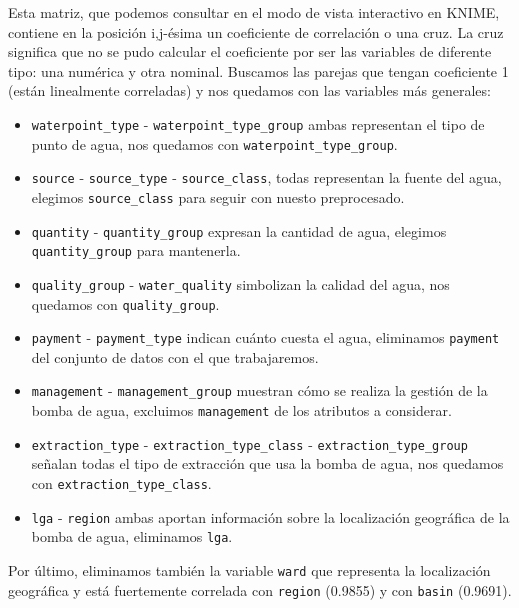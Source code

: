 \documentclass[a4paper, 20pt]{article}
\begin{document}
Esta matriz, que podemos consultar en el modo de vista interactivo en KNIME, contiene en la posición i,j-ésima un coeficiente de correlación o una cruz. La cruz significa que no se pudo calcular el coeficiente por ser las variables de diferente tipo: una numérica y otra nominal. Buscamos las parejas que tengan coeficiente 1 (están linealmente correladas) y nos quedamos con las variables más generales:
\begin{itemize}
\item \texttt{waterpoint\_type} - \texttt{waterpoint\_type\_group} ambas representan el tipo de punto de agua, nos quedamos con \texttt{waterpoint\_type\_group}.
  
\item \texttt{source} - \texttt{source\_type} - \texttt{source\_class}, todas representan la fuente del agua, elegimos \texttt{source\_class} para seguir con nuesto preprocesado.
  
\item \texttt{quantity} - \texttt{quantity\_group} expresan la cantidad de agua, elegimos \texttt{quantity\_group} para mantenerla.
  
\item \texttt{quality\_group} - \texttt{water\_quality} simbolizan la calidad del agua, nos quedamos con \texttt{quality\_group}.

\item \texttt{payment} - \texttt{payment\_type} indican cuánto cuesta el agua, eliminamos \texttt{payment} del conjunto de datos con el que trabajaremos.

\item \texttt{management} - \texttt{management\_group} muestran cómo se realiza la gestión de la bomba de agua, excluimos \texttt{management} de los atributos a considerar.

\item \texttt{extraction\_type} - \texttt{extraction\_type\_class} - \texttt{extraction\_type\_group} señalan todas el tipo de extracción que usa la bomba de agua, nos quedamos con \texttt{extraction\_type\_class}.

  \item \texttt{lga} - \texttt{region} ambas aportan información sobre la localización geográfica de la bomba de agua, eliminamos \texttt{lga}.
\end{itemize}

Por último, eliminamos también la variable \texttt{ward} que representa la localización geográfica y está fuertemente correlada con \texttt{region} (0.9855) y con \texttt{basin} (0.9691).
\end{document}
